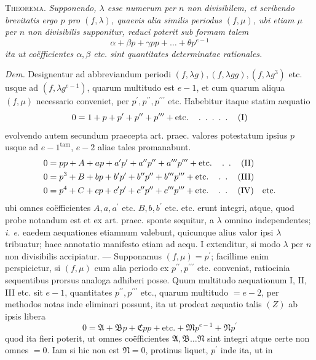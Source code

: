 \textsc{Theorema.} \textit{Supponendo, \(\lambda\) esse numerum per \(n\) non divisibilem, et scribendo} \textit{brevitatis ergo \(p\) pro \((f,\allowbreak \lambda)\), quaevis alia similis periodus \((f,\allowbreak \mu)\), ubi etiam \(\mu\) per \(n\)} \textit{non divisibilis supponitur, reduci poterit sub formam talem} \[\alpha+\beta p+\gamma pp+\ldots+\theta p^{e-1}\] \textit{ita ut coëfficientes \(\alpha,\allowbreak \beta\) etc. sint quantitates determinatae rationales.}

\textit{Dem.} Designentur ad abbreviandum periodi \((f,\allowbreak \lambda g),\allowbreak (f,\allowbreak \lambda gg),\allowbreak (f,\allowbreak \lambda g^3)\) etc. usque ad \((f,\allowbreak \lambda g^{e-1})\), quarum multitudo est \(e-1\), et cum quarum aliqua \((f,\allowbreak \mu)\) necessario conveniet, per \(p^{\prime},\allowbreak p^{\prime\prime},\allowbreak p^{\prime\prime\prime}\) etc. Habebitur itaque statim aequatio \[0=1+p+p^{\prime}+p^{\prime\prime}+p^{\prime\prime\prime}+\text{etc.}\quad\mathinner{\ldotp\ \ldotp\ \ldotp\ \ldotp\ \ldotp}\quad(\mathrm I)\] evolvendo autem secundum praecepta art. praec. valores potestatum ipsius \(p\) usque ad \(e-1^{\mathrm{tam}}\), \(e-2\) aliae tales promanabunt. \[\begin{aligned}0&=pp+A+ap+a^{\prime} p^{\prime}+a^{\prime\prime} p^{\prime\prime}+a^{\prime\prime\prime} p^{\prime\prime\prime}+\text{etc.}\quad\mathinner{\ldotp\ \ldotp}\quad(\mathrm{II})\\0&=p^3+B+bp+b^{\prime} p^{\prime}+b^{\prime\prime} p^{\prime\prime}+b^{\prime\prime\prime} p^{\prime\prime\prime}+\text{etc.}\quad\mathinner{\ldotp\ \ldotp}\quad(\mathrm{III})\\0&=p^4+C+cp+c^{\prime} p^{\prime}+c^{\prime\prime} p^{\prime\prime}+c^{\prime\prime\prime} p^{\prime\prime\prime}+\text{etc.}\quad\mathinner{\ldotp\ \ldotp}\quad(\mathrm{IV})\quad\text{etc.}\end{aligned}\] ubi omnes coëfficientes \(A,\allowbreak a,\allowbreak a^{\prime}\) etc. \(B,\allowbreak b,\allowbreak b^{\prime}\) etc. etc. erunt integri, atque, quod probe notandum est et ex art. praec. sponte sequitur, a \(\lambda\) omnino independentes; \textit{i. e.} eaedem aequationes etiamnum valebunt, quicunque alius valor ipsi \(\lambda\) tribuatur; haec annotatio manifesto etiam ad aequ. I extenditur, si modo \(\lambda\) per \(n\) non divisibilis accipiatur. --- Supponamus \((f,\allowbreak \mu)=p^{\prime}\); facillime enim perspicietur, si \((f,\allowbreak \mu)\) cum alia periodo ex \(p^{\prime\prime},\allowbreak p^{\prime\prime\prime}\) etc. conveniat, ratiocinia sequentibus prorsus analoga adhiberi posse. Quum multitudo aequationum I, II, III etc. sit \(e-1\), quantitates \(p^{\prime\prime},\allowbreak p^{\prime\prime\prime}\) etc., quarum multitudo \(=e-2\), per methodos notas inde eliminari possunt, ita ut prodeat aequatio talis \((Z)\) ab ipsis libera \[0=\mathfrak A+\mathfrak Bp+\mathfrak Cpp+\text{etc.}+\mathfrak Mp^{e-1}+\mathfrak Np^{\prime}\] quod ita fieri poterit, ut omnes coëfficientes \(\mathfrak A,\allowbreak \mathfrak B\ldots\mathfrak N\) sint integri atque certe non omnes \(=0\). Iam si hic non est \(\mathfrak N=0\), protinus liquet, \(p^{\prime}\) inde ita, ut in
